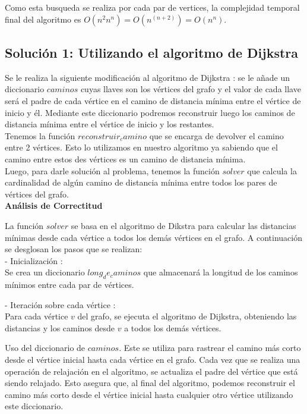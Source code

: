 \documentclass[
10pt, %
a4paper, %
oneside, %
headinclude,footinclude, %
BCOR5mm, %
]{scrartcl}
\begin{document}
Como esta busqueda se realiza por cada par de vertices, la complejidad temporal final del algoritmo es 
$O (n^2n^n) = O (n^(n+2)) = O (n^n)$.


\subsection{Solución 1: Utilizando el algoritmo de Dijkstra}

Se le realiza la siguiente modificación al algoritmo de Dijkstra : se le 
añade un diccionario $caminos$ cuyas llaves son los vértices del grafo 
y el valor de cada llave será el padre de cada vértice en el camino de distancia 
mínima entre el vértice de inicio y él. Mediante este diccionario podremos reconstruir 
luego los caminos de distancia mínima entre el vértice de inicio y los restantes. \\

Tenemos la función $reconstruir_camino$ que se encarga de devolver el camino entre 2 vértices. Esto 
lo utilizamos en nuestro algoritmo ya sabiendo que el camino entre estos des vértices es un camino de 
distancia mínima.\\

Luego, para darle solución al problema, tenemos la función $solver$ que calcula la cardinalidad de algún 
camino de distancia mínima entre todos los pares de vértices del grafo.\\


\textbf{Análisis de Correctitud}

La función $solver$ se basa en el algoritmo de Dikstra para calcular las distancias mínimas desde 
cada vértice a todos los demás vértices en el grafo. A continuación se desglosan los pasos que se realizan:\\

- Inicialización :\\
Se crea un diccionario ${long_de_caminos}$ que almacenará la longitud de los caminos mínimos entre cada par de 
vértices.


- Iteración sobre cada vértice :\\ 
Para cada vértice $v$ del grafo, se ejecuta el algoritmo de Dijkstra, obteniendo las distancias y los caminos desde $v$
a todos los demás vértices.

Uso del diccionario de $caminos$. Este se utiliza para rastrear el camino más corto desde el vértice inicial hasta cada 
vértice en el grafo. Cada vez que se realiza una operación de relajación en el algoritmo, se actualiza el padre del vértice 
que está siendo relajado. Esto asegura que, al final del algoritmo, podemos reconstruir el camino más corto desde el vértice inicial
hasta cualquier otro vértice utilizando este diccionario.
\end{document}
